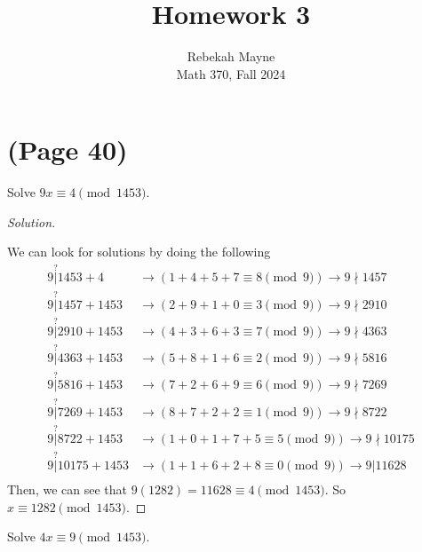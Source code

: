 \documentclass[11pt]{article}
\newcommand{\ndiv}{\nmid}
\newenvironment{problem}[2][Problem]{\begin{trivlist}
\item[\hskip \labelsep {\bfseries #1}\hskip \labelsep {\bfseries #2.}]}{\end{trivlist}}
\newenvironment{solution}
  {\renewcommand\qedsymbol{$~$}\begin{proof}[Solution]$ $\par\nobreak\ignorespaces}
  {\end{proof}}
\begin{document}
\title{Homework 3}
\author{Rebekah Mayne\\
    Math 370, Fall 2024}
\maketitle


\section{(Page 40)}

\begin{problem}{7}
Solve $9x\equiv 4 \pmod{1453}$.
\end{problem}

\begin{solution}
    We can look for solutions by doing the following
    \begin{align*}
        9 \stackrel{?}{|} 1453+4     & \rightarrow (1+4+5+7\equiv 8 \pmod{9})                          \rightarrow 9 \ndiv 1457  \\
        9 \stackrel{?}{|} 1457+1453  & \rightarrow(2+9+1+0\equiv 3 \pmod{9})                           \rightarrow  9 \ndiv 2910 \\
        9 \stackrel{?}{|} 2910+1453  & \rightarrow(4+3+6+3\equiv 7 \pmod{9})\rightarrow  9 \ndiv 4363                            \\
        9 \stackrel{?}{|} 4363+1453  & \rightarrow(5+8+1+6\equiv 2 \pmod{9})\rightarrow  9 \ndiv 5816                            \\
        9 \stackrel{?}{|} 5816+1453  & \rightarrow(7+2+6+9\equiv 6 \pmod{9})\rightarrow  9 \ndiv 7269                            \\
        9 \stackrel{?}{|} 7269+1453  & \rightarrow(8+7+2+2\equiv 1 \pmod{9})\rightarrow  9 \ndiv 8722                            \\
        9 \stackrel{?}{|} 8722+1453  & \rightarrow(1+0+1+7+5\equiv 5 \pmod{9})\rightarrow  9 \ndiv 10175                         \\
        9 \stackrel{?}{|} 10175+1453 & \rightarrow(1+1+6+2+8\equiv 0 \pmod{9})\rightarrow  9 | 11628                             \\
    \end{align*}
    Then, we can see that $9(1282)=11628 \equiv 4 \pmod{1453}$. So $x\equiv 1282 \pmod{1453}$.
\end{solution}



\begin{problem}{8}
Solve $4x\equiv 9 \pmod{1453}.$
\end{problem}
\end{document}
